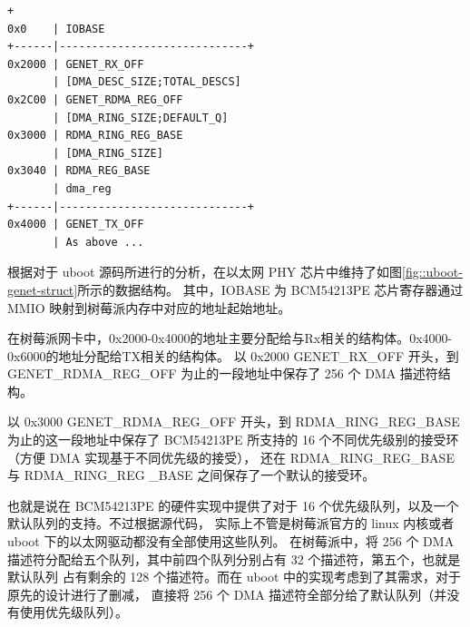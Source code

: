     \begin{minipage}[t]{0.42\linewidth}
    \begin{lstlisting}[columns=fullflexible]
       +
0x0    | IOBASE
+------|-----------------------------+
0x2000 | GENET_RX_OFF
       | [DMA_DESC_SIZE;TOTAL_DESCS]
0x2C00 | GENET_RDMA_REG_OFF
       | [DMA_RING_SIZE;DEFAULT_Q]
0x3000 | RDMA_RING_REG_BASE
       | [DMA_RING_SIZE]
0x3040 | RDMA_REG_BASE
       | dma_reg
+------|-----------------------------+
0x4000 | GENET_TX_OFF
       | As above ...
        \end{lstlisting}
    \end{minipage}
    \quad
    \begin{minipage}[t]{0.5\linewidth}
        \vspace{2em}
        \setlength{\parindent}{1em}
        根据对于 uboot 源码所进行的分析，在以太网 PHY 芯片中维持了如图\ref{fig::uboot-genet-struct}所示的数据结构。
        其中，IOBASE 为 BCM54213PE 芯片寄存器通过 MMIO 映射到树莓派内存中对应的地址起始地址。

        在树莓派网卡中，0x2000-0x4000的地址主要分配给与Rx相关的结构体。0x4000-0x6000的地址分配给TX相关的结构体。
        以 0x2000 GENET\_RX\_OFF 开头，到 GENET\_RDMA\_REG\_OFF 为止的一段地址中保存了 256 个 DMA 描述符结构。
    \end{minipage}

    以 0x3000 GENET\_RDMA\_REG\_OFF 开头，到 RDMA\_RING\_REG\_BASE 为止的这一段地址中保存了 BCM54213PE 
    所支持的 16 个不同优先级别的接受环（方便 DMA 实现基于不同优先级的接受），
    还在 RDMA\_RING\_REG\_BASE 与 RDMA\_RING\_REG \_BASE 之间保存了一个默认的接受环。

    也就是说在 BCM54213PE 的硬件实现中提供了对于 16 个优先级队列，以及一个默认队列的支持。不过根据源代码，
    实际上不管是树莓派官方的 linux 内核或者 uboot 下的以太网驱动都没有全部使用这些队列。
    在树莓派中，将 256 个 DMA 描述符分配给五个队列，其中前四个队列分别占有 32 个描述符，第五个，也就是默认队列
    占有剩余的 128 个描述符。而在 uboot 中的实现考虑到了其需求，对于原先的设计进行了删减，
    直接将 256 个 DMA 描述符全部分给了默认队列（并没有使用优先级队列）。
    
